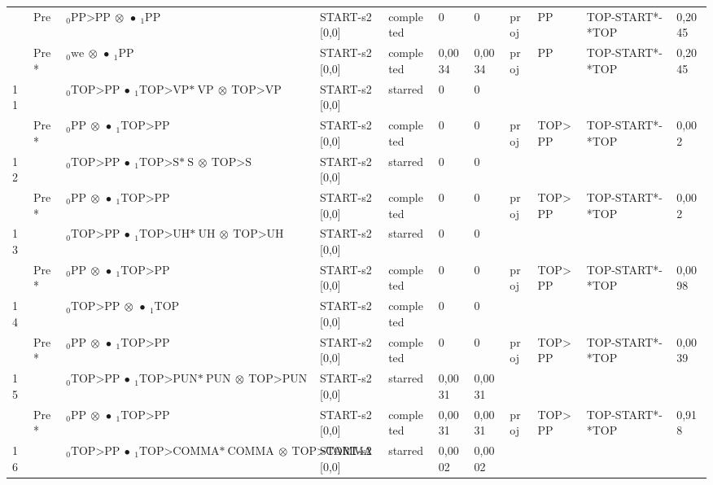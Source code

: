 \documentclass[10pt]{article}
\begin{document}
\begin{longtable}[htbp]{lllllllllll}
 & Pre & $ {}_0 \textrm{PP>PP} \  \otimes \  \bullet \ {}_{1} \textrm{PP} $ & START-s2 [0,0] & completed & 0 & 0 & proj & PP & TOP-START*-*TOP & 0,2045 \\ 
 & Pre *& $ {}_0 \textrm{we} \  \otimes \  \bullet \ {}_{1} \textrm{PP} $ & START-s2 [0,0] & completed & 0,0034 & 0,0034 & proj & PP & TOP-START*-*TOP & 0,2045 \\ 
11 & & $ {}_0 \textrm{TOP>PP} \  \bullet \ {}_{1} \textrm{TOP>VP*} \ \textrm{VP} \  \otimes \ \textrm{TOP>VP} $ & START-s2 [0,0] & starred & 0 & 0 & & & & \\ 
 & Pre *& $ {}_0 \textrm{PP} \  \otimes \  \bullet \ {}_{1} \textrm{TOP>PP} $ & START-s2 [0,0] & completed & 0 & 0 & proj & TOP>PP & TOP-START*-*TOP & 0,002 \\ 
12 & & $ {}_0 \textrm{TOP>PP} \  \bullet \ {}_{1} \textrm{TOP>S*} \ \textrm{S} \  \otimes \ \textrm{TOP>S} $ & START-s2 [0,0] & starred & 0 & 0 & & & & \\ 
 & Pre *& $ {}_0 \textrm{PP} \  \otimes \  \bullet \ {}_{1} \textrm{TOP>PP} $ & START-s2 [0,0] & completed & 0 & 0 & proj & TOP>PP & TOP-START*-*TOP & 0,002 \\ 
13 & & $ {}_0 \textrm{TOP>PP} \  \bullet \ {}_{1} \textrm{TOP>UH*} \ \textrm{UH} \  \otimes \ \textrm{TOP>UH} $ & START-s2 [0,0] & starred & 0 & 0 & & & & \\ 
 & Pre *& $ {}_0 \textrm{PP} \  \otimes \  \bullet \ {}_{1} \textrm{TOP>PP} $ & START-s2 [0,0] & completed & 0 & 0 & proj & TOP>PP & TOP-START*-*TOP & 0,0098 \\ 
14 & & $ {}_0 \textrm{TOP>PP} \  \otimes \  \bullet \ {}_{1} \textrm{TOP} $ & START-s2 [0,0] & completed & 0 & 0 & & & & \\ 
 & Pre *& $ {}_0 \textrm{PP} \  \otimes \  \bullet \ {}_{1} \textrm{TOP>PP} $ & START-s2 [0,0] & completed & 0 & 0 & proj & TOP>PP & TOP-START*-*TOP & 0,0039 \\ 
15 & & $ {}_0 \textrm{TOP>PP} \  \bullet \ {}_{1} \textrm{TOP>PUN*} \ \textrm{PUN} \  \otimes \ \textrm{TOP>PUN} $ & START-s2 [0,0] & starred & 0,0031 & 0,0031 & & & & \\ 
 & Pre *& $ {}_0 \textrm{PP} \  \otimes \  \bullet \ {}_{1} \textrm{TOP>PP} $ & START-s2 [0,0] & completed & 0,0031 & 0,0031 & proj & TOP>PP & TOP-START*-*TOP & 0,918 \\ 
16 & & $ {}_0 \textrm{TOP>PP} \  \bullet \ {}_{1} \textrm{TOP>COMMA*} \ \textrm{COMMA} \  \otimes \ \textrm{TOP>COMMA} $ & START-s2 [0,0] & starred & 0,0002 & 0,0002 & & & & \\ 

\end{longtable}
\end{document}
